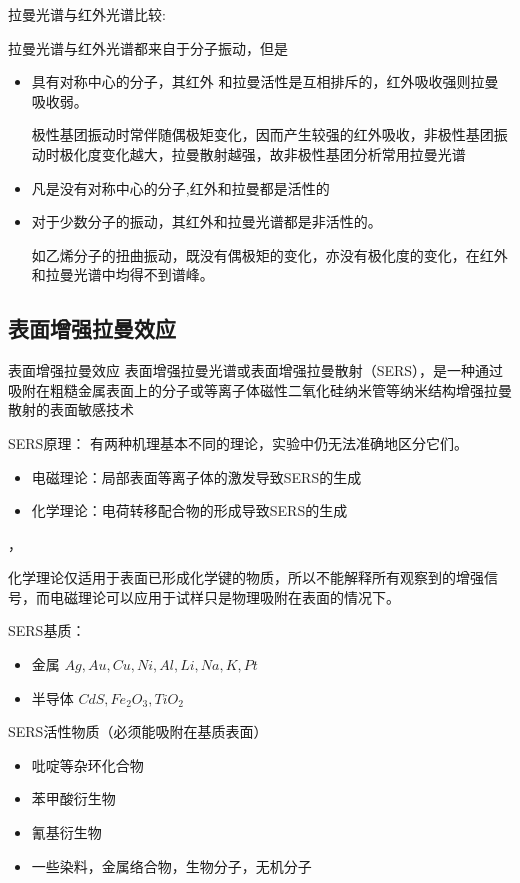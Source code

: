 \begin{note}
    拉曼光谱与红外光谱比较:

    拉曼光谱与红外光谱都来自于分子振动，但是
    \begin{itemize}
        \item 具有对称中心的分子，其红外	和拉曼活性是互相排斥的，红外吸收强则拉曼吸收弱。
        
        \begin{example}
            极性基团振动时常伴随偶极矩变化，因而产生较强的红外吸收，非极性基团振动时极化度变化越大，拉曼散射越强，故非极性基团分析常用拉曼光谱
        \end{example}
        \item 凡是没有对称中心的分子,红外和拉曼都是活性的
        \item 对于少数分子的振动，其红外和拉曼光谱都是非活性的。
        \begin{example}
            如乙烯分子的扭曲振动，既没有偶极矩的变化，亦没有极化度的变化，在红外和拉曼光谱中均得不到谱峰。
        \end{example}
    \end{itemize}
\end{note}
\subsection{表面增强拉曼效应}
\begin{definition*}{表面增强拉曼效应}
    表面增强拉曼光谱或表面增强拉曼散射（SERS），是一种通过吸附在粗糙金属表面上的分子或等离子体磁性二氧化硅纳米管等纳米结构增强拉曼散射的表面敏感技术
\end{definition*}

SERS原理：
有两种机理基本不同的理论，实验中仍无法准确地区分它们。
\begin{itemize}
    \item 电磁理论：局部表面等离子体的激发导致SERS的生成
    \item 化学理论：电荷转移配合物的形成导致SERS的生成
\end{itemize}，
\begin{note}
    化学理论仅适用于表面已形成化学键的物质，所以不能解释所有观察到的增强信号，而电磁理论可以应用于试样只是物理吸附在表面的情况下。
\end{note}

SERS基质： 
\begin{itemize}
    \item     金属    $Ag, Au, Cu,Ni, Al, Li, Na, K, Pt$
    \item     半导体  $CdS, Fe_{2}O_{3}, TiO_{2}$
\end{itemize}


SERS活性物质（必须能吸附在基质表面）
\begin{itemize}
    \item 	吡啶等杂环化合物
    \item   苯甲酸衍生物
    \item   氰基衍生物
    \item   一些染料，金属络合物，生物分子，无机分子
\end{itemize}
